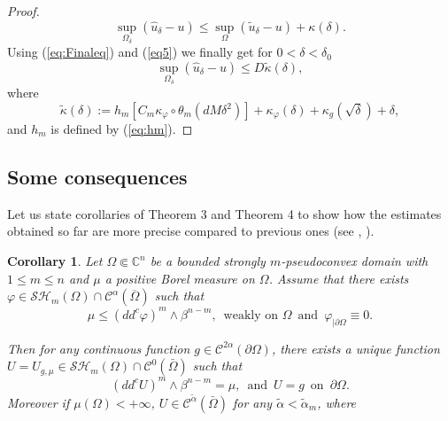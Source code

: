 \documentclass[12pt]{amsart}
\newtheorem{corollary}[theorem]{Corollary}
\theoremstyle{definition}
\numberwithin{theorem}{section}
\numberwithin{equation}{section}
\newcommand{\C}{\mathbb{C}}
\begin{document}
{\begin{proof}
 
  \begin{equation} \label{eq5}
   \sup_{\Omega_{\delta}}( \hat{u}_{\delta}-u) \leq \sup_{\Omega}(\tilde{u}_{\delta}-u)+ \kappa (\delta) .
  \end{equation}
  Using (\ref{eq:Finaleq}) and (\ref{eq5}) we finally get for $0 < \delta < \delta_0$
  \begin{equation} \label{eq:MC-estimate}
   \sup_{\Omega_{\delta}}( \hat{u}_{\delta}-u) \leq D \tilde{\kappa} (\delta),
 \end{equation}
 where 
\begin{equation} \label {eq:MC-Solution}
\tilde \kappa (\delta) :=   h_m \left[C_m \kappa_\varphi \circ \theta_m  \left(d M \delta^{2} \right)\right]  +  \kappa_\varphi (\delta) + \kappa_g (\sqrt{\delta}) + \delta,
 \end{equation}
 and $h_m$ is defined by (\ref{eq:hm}).
 \end{proof}

 




\subsection{Some consequences}
Let us state  corollaries of Theorem 3 and Theorem 4 to show how the  estimates obtained so far are more precise compared to previous ones (see \cite{KN19}, \cite{BZ20}).

\begin{corollary} \label{cor:HolderHess}
Let $\Omega \Subset \C^n$ be a  bounded strongly $m$-pseudoconvex  domain  with $1 \leq  m \leq n$ and $\mu $ a positive Borel measure on $\Omega$. Assume that there exists $\varphi\in \mathcal{SH}_m(\Omega)\cap\mathcal{C}^{\alpha}(\overline\Omega)$ such that  
\begin{equation} \label{eq:subsol2}
 \mu \leq (dd^c\varphi)^m\wedge\beta^{n-m}, \, \, \, \mathrm{weakly \, \, on} \, \,  \Omega \, \, \, \mathrm{and} \, \, \, \varphi_{\mid{\partial \Omega}} \equiv 0.
\end{equation} 
 

 Then for any continuous function $g \in \mathcal{C}^{2 \alpha} (\partial \Omega)$, there exists a unique function $U = U_{g,\mu} \in \mathcal{SH}_m (\Omega) \cap \mathcal{C}^{0} (\bar{\Omega})$ such that  
 $$
 (dd^c U)^m\wedge\beta^{n-m} = \mu, \, \, \, \mathrm{and} \, \, \, U = g \, \, \, \mathrm{on} \, \, \,  \partial \Omega.
 $$
 Moreover if $\mu (\Omega) < + \infty$, $U \in \mathcal{C}^{\tilde{\alpha}} (\bar{\Omega})$ for any $\tilde{\alpha} <  \tilde{\alpha}_m$,
where


\end{corollary}}
\end{document}
